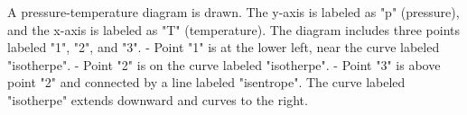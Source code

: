 A pressure-temperature diagram is drawn. The y-axis is labeled as "p" (pressure), and the x-axis is labeled as "T" (temperature). The diagram includes three points labeled "1", "2", and "3".  
- Point "1" is at the lower left, near the curve labeled "isotherpe".  
- Point "2" is on the curve labeled "isotherpe".  
- Point "3" is above point "2" and connected by a line labeled "isentrope".  
The curve labeled "isotherpe" extends downward and curves to the right.